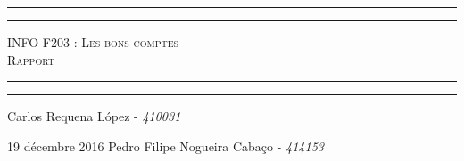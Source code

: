 \begin{titlepage}

\begin{center}
    \vspace*{\fill}
        \hrule
        \vspace*{2pt}
        \hrule
        \vspace*{15pt}
        \textsc{\Huge{INFO-F203 : Les bons comptes \\\vspace*{8pt} Rapport}}
        \vspace*{15pt}
        \hrule
        \vspace*{2pt}
        \hrule
  \vspace*{\fill}
\end{center}
\null
\vfill
  
\hfill \large{Carlos Requena López - \emph{410031}}

\large{19 décembre 2016} \hfill \large{Pedro Filipe Nogueira Cabaço} - \emph{414153}



\end{titlepage}